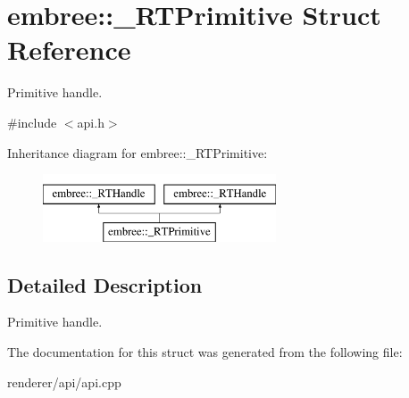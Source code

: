 \hypertarget{structembree_1_1___r_t_primitive}{
\section{embree::\_\-RTPrimitive Struct Reference}
\label{structembree_1_1___r_t_primitive}
}


Primitive handle.  




{\ttfamily \#include $<$api.h$>$}

Inheritance diagram for embree::\_\-RTPrimitive:\begin{figure}[H]
\begin{center}
\leavevmode
\includegraphics[height=2.000000cm]{structembree_1_1___r_t_primitive}
\end{center}
\end{figure}


\subsection{Detailed Description}
Primitive handle. 

The documentation for this struct was generated from the following file:\begin{DoxyCompactItemize}
\item 
renderer/api/api.cpp\end{DoxyCompactItemize}
